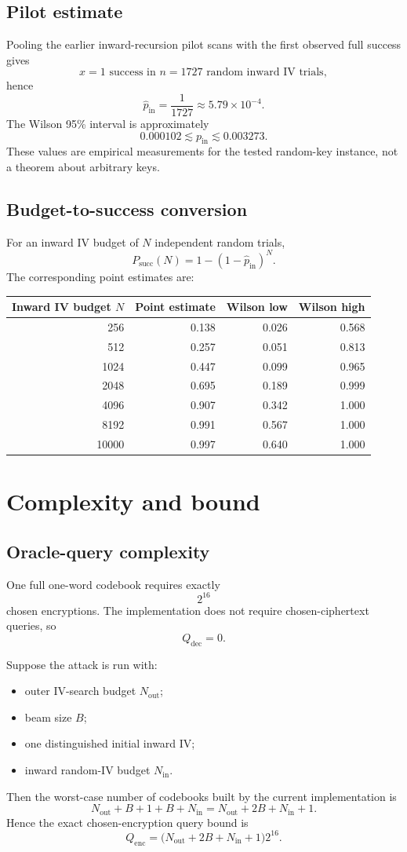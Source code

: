\documentclass[11pt]{article}
\begin{document}
\subsection{Pilot estimate}
Pooling the earlier inward-recursion pilot scans with the first observed full success gives
\[
x=1 \text{ success in } n=1727 \text{ random inward IV trials},
\]
hence
\[
\widehat{p}_{\mathrm{in}}=\frac{1}{1727}\approx 5.79\times 10^{-4}.
\]
The Wilson 95\% interval is approximately
\[
0.000102 \lesssim p_{\mathrm{in}} \lesssim 0.003273.
\]
These values are empirical measurements for the tested random-key instance, not a theorem about arbitrary keys.

\subsection{Budget-to-success conversion}
For an inward IV budget of $N$ independent random trials,
\[
P_{\mathrm{succ}}(N)=1-(1-\widehat{p}_{\mathrm{in}})^N.
\]
The corresponding point estimates are:
\begin{center}
\begin{tabular}{rrrr}
\toprule
Inward IV budget $N$ & Point estimate & Wilson low & Wilson high \\
\midrule
256   & 0.138 & 0.026 & 0.568 \\
512   & 0.257 & 0.051 & 0.813 \\
1024  & 0.447 & 0.099 & 0.965 \\
2048  & 0.695 & 0.189 & 0.999 \\
4096  & 0.907 & 0.342 & 1.000 \\
8192  & 0.991 & 0.567 & 1.000 \\
10000 & 0.997 & 0.640 & 1.000 \\
\bottomrule
\end{tabular}
\end{center}

\section{Complexity and bound}
\subsection{Oracle-query complexity}
One full one-word codebook requires exactly
\[
2^{16}
\]
chosen encryptions. The implementation does not require chosen-ciphertext queries, so
\[
Q_{\mathrm{dec}}=0.
\]

Suppose the attack is run with:
\begin{itemize}[leftmargin=1.5em]
\item outer IV-search budget $N_{\mathrm{out}}$;
\item beam size $B$;
\item one distinguished initial inward IV;
\item inward random-IV budget $N_{\mathrm{in}}$.
\end{itemize}
Then the worst-case number of codebooks built by the current implementation is
\[
N_{\mathrm{out}} + B + 1 + B + N_{\mathrm{in}}
=
N_{\mathrm{out}} + 2B + N_{\mathrm{in}} + 1.
\]
Hence the exact chosen-encryption query bound is
\[
Q_{\mathrm{enc}}
=
\bigl(N_{\mathrm{out}} + 2B + N_{\mathrm{in}} + 1\bigr)2^{16}.
\]
\end{document}
